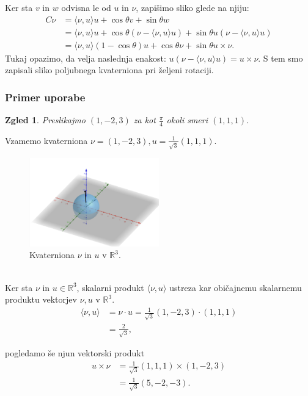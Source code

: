\documentclass[a4paper,12pt]{article}
\def\R{\mathbb{R}} %
\newcommand{\dotpr}[2]{\langle #1, #2 \rangle}
\newtheorem{zgled}{Zgled}
\begin{document}
Ker sta $v$ in $w$ odvisna le od $u$ in $\nu$, zapišimo sliko glede na njiju:
\begin{align*}
   C\nu &= \dotpr{\nu}{u}u + \cos\theta v + \sin\theta w\\
        &= \dotpr{\nu}{u}u + \cos\theta (\nu - \dotpr{\nu}{u}u) + \sin\theta u(\nu - \dotpr{\nu}{u}u)\\
        &= \dotpr{\nu}{u}(1 - \cos\theta)u + \cos\theta \nu + \sin\theta u\times\nu.
\end{align*}
Tukaj opazimo, da velja naslednja enakost: $u(\nu - \dotpr{\nu}{u}u) = u\times\nu$. S tem smo zapisali sliko poljubnega kvaterniona pri željeni rotaciji.
\subsubsection{Primer uporabe}

\begin{zgled}
   Preslikajmo $(1, -2, 3)$ za kot $\frac{\pi}{4}$ okoli smeri $(1,1,1)$.
\end{zgled}
Vzamemo kvaterniona $\nu = (1, -2, 3), u = \frac{1}{\sqrt{3}}(1,1,1)$.
\begin{figure}[h]
   \centering
   \includegraphics[width = 0.5\textwidth]{vektorji_u_nu}
   \caption{Kvaterniona $\nu$ in $u$ v $\R^3$.}
\end{figure}\\
Ker sta $\nu$ in $u \in \R^3$, skalarni produkt $\dotpr{\nu}{u}$ ustreza kar običajnemu skalarnemu produktu vektorjev $\nu, u$ v $\R^3$.
\begin{align*}
   \dotpr{\nu}{u} &= \nu \cdot u = \frac{1}{\sqrt{3}} (1, -2, 3) \cdot (1,1,1)\\
                  &= \frac{2}{\sqrt{3}},
\end{align*}

\noindent pogledamo še njun vektorski produkt
\begin{align*}
   u \times \nu &= \frac{1}{\sqrt{3}}(1,1,1)\times(1,-2,3)\\
                &= \frac{1}{\sqrt{3}}(5,-2,-3).
\end{align*}
\end{document}

